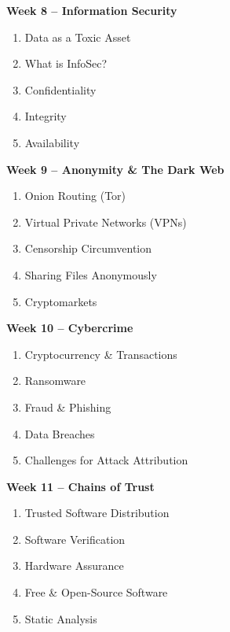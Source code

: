 \documentclass[11pt, a4paper]{article}
\begin{document}
\vspace*{.1in}
\noindent\textbf{Week 8 -- Information Security}
\begin{enumerate}
\item Data as a Toxic Asset %
\item What is InfoSec?
\item Confidentiality
\item Integrity
\item Availability
\end{enumerate}

\vspace*{.1in}
\noindent\textbf{Week 9 -- Anonymity \& The Dark Web}
\begin{enumerate}
\item Onion Routing (Tor)
\item Virtual Private Networks (VPNs)
\item Censorship Circumvention
\item Sharing Files Anonymously
\item Cryptomarkets %
\end{enumerate}

\vspace*{.1in}
\noindent\textbf{Week 10 -- Cybercrime}
\begin{enumerate}
\item Cryptocurrency \& Transactions %
\item Ransomware
\item Fraud \& Phishing
\item Data Breaches
\item Challenges for Attack Attribution
\end{enumerate}

\vspace*{.1in}
\noindent\textbf{Week 11 -- Chains of Trust}
\begin{enumerate}
\item Trusted Software Distribution
\item Software Verification
\item Hardware Assurance
\item Free \& Open-Source Software
\item Static Analysis
\end{enumerate}
\end{document}
